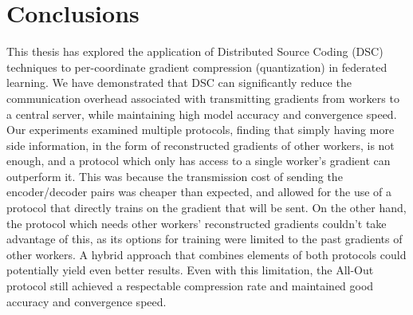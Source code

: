 \section{Conclusions}
This thesis has explored the application of Distributed Source Coding (DSC) techniques to per-coordinate gradient compression (quantization) in federated learning. We have demonstrated that DSC can significantly reduce the communication overhead associated with transmitting gradients from workers to a central server, while maintaining high model accuracy and convergence speed. Our experiments examined multiple protocols, finding that simply having more side information, in the form of reconstructed gradients of other workers, is not enough, and a protocol which only has access to a single worker's gradient can outperform it. This was because the transmission cost of sending the encoder/decoder pairs was cheaper than expected, and allowed for the use of a protocol that directly trains on the gradient that will be sent. On the other hand, the protocol which needs other workers' reconstructed gradients couldn't take advantage of this, as its options for training were limited to the past gradients of other workers. A hybrid approach that combines elements of both protocols could potentially yield even better results. Even with this limitation, the All-Out protocol still achieved a respectable compression rate and maintained good accuracy and convergence speed.
